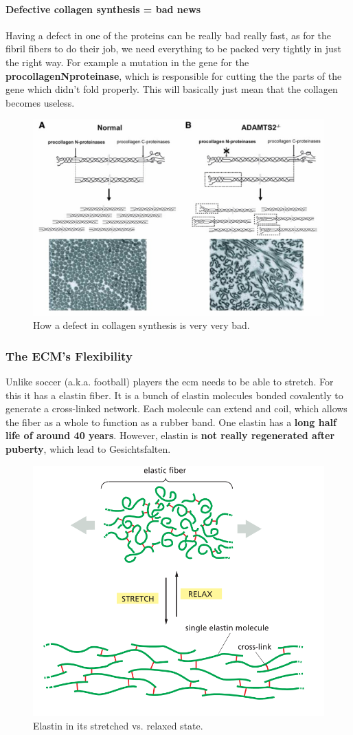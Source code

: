 \documentclass[../main.tex]{subfiles}
\begin{document}
\paragraph{Defective collagen synthesis = bad news}

Having a defect in one of the proteins can be really bad really fast, as for the fibril fibers to do their job, we need everything to be packed very tightly in just the right way. For example a mutation in the gene for the \textbf{\gls{procollagenNproteinase}}, which is responsible for cutting the the parts of the gene which didn't fold properly. This will basically just mean that the collagen becomes useless.

\begin{figure}[H]
	\centering
	\includegraphics[width=0.6\linewidth]{coll_defe}
	\caption{How a defect in collagen synthesis is very very bad.}
	\label{fig:colldefe}
\end{figure}


\subsubsection{The ECM's Flexibility}

Unlike soccer (a.k.a. football) players the ecm needs to be able to stretch. For this it has a \gls{elastin} fiber. It is a bunch of elastin molecules bonded covalently to generate a cross-linked network. Each molecule can extend and coil, which allows the fiber as a whole to function as a rubber band. One elastin has a \textbf{long half life of around 40 years}. However, elastin is \textbf{not really regenerated after puberty}, which lead to Gesichtsfalten. 

\begin{figure}[H]
	\centering
	\includegraphics[width=0.5\linewidth]{ela_over}
	\caption{Elastin in its stretched vs. relaxed state.}
	\label{fig:elaover}
\end{figure}
\end{document}
